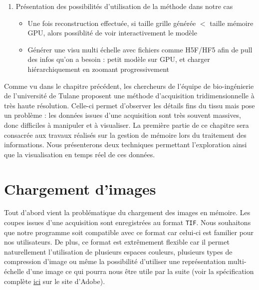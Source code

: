 {{\begin{enumerate}
\begin{itemize}
\begin{itemize}
				\end{itemize}
			\end{itemize}
			\item Présentation des possibilités d'utilisation de la méthode dans notre cas~\begin{itemize}
				\item Une fois reconstruction effectuée, si taille grille générée $<$ taille mémoire GPU, alors possiblité de voir interactivement le modèle
				\item Générer une visu multi échelle avec fichiers comme H5F/HF5 afin de pull des infos qu'on a besoin : petit modèle sur GPU, et charger hiérarchiquement en zoomant progressivement
			\end{itemize}
		\end{enumerate}
	}
	\fi

	Comme vu dans le chapitre précédent, les chercheurs de l'équipe de bio-ingénierie de l'université de Tulane proposent une méthode d'acquisition tridimensionnelle à très haute résolution. Celle-ci permet d'observer les détails fins du tissu mais pose un problème : les données issues d'une acquisition sont très souvent massives, donc difficiles à manipuler et à visualiser. La première partie de ce chapitre sera consacrée aux travaux réalisés sur la gestion de mémoire lors du traitement des informations. Nous présenterons deux techniques permettant l'exploration ainsi que la visualisation en temps réel de ces données.
	
	\section{Chargement d'images}\label{section:loading}
	{
        Tout d'abord vient la problématique du chargement des images en mémoire. Les coupes issues d'une acquisition sont enregistrées au format \texttt{TIF}. Nous souhaitons que notre programme soit compatible avec ce format car celui-ci est familier pour nos utilisateurs. De plus, ce format est extrêmement flexible car il permet naturellement l'utilisation de plusieurs espaces couleurs, plusieurs types de compression d'image ou même la possibilité d'utiliser une représentation multi-échelle d'une image ce qui pourra nous être utile par la suite (voir la spécification complète \href{https://www.adobe.io/content/dam/udp/en/open/standards/tiff/TIFF6.pdf}{ici} sur le site d'Adobe). 
        
}}
